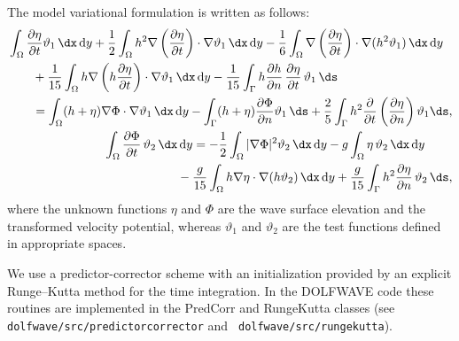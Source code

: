The model variational formulation is written as follows:
\begin{subequations}\label{eq:lopes:varform}
\begin{align}
\begin{split}
&\displaystyle \int_\Omega\frac{\partial \eta}{\partial t}\vartheta_1\, \dx\, \mathrm{d}y
  +\frac{1}{2}\int_\Omega
  h^2\nabla\left(\frac{\partial \eta}{\partial t}\right)\cdot\nabla\vartheta_1\,
  \dx\, \mathrm{d}y- \frac{1}{6}\int_\Omega \nabla\left(
  \frac{\partial \eta}{\partial t}\right)\cdot\nabla(h^2\vartheta_1)\,
  \dx\, \mathrm{d}y\\
 &\quad \quad\displaystyle +
  \frac{1}{15}\int_\Omega
  h\nabla\left(h\frac{\partial \eta}{\partial t}\right)\cdot
  \nabla\vartheta_1\, \dx\, \mathrm{d}y- \frac{1}{15}\int_\Gamma
  h\frac{\partial h}{\partial n}\,\frac{\partial \eta}{\partial t}\,\vartheta_1\, \ds
  \\ &\quad\quad=\displaystyle
  \int_\Omega(h+\eta)\nabla\Phi\cdot\nabla\vartheta_1\,
  \dx\, \mathrm{d}y -\int_\Gamma(h+\eta)\frac{\partial \Phi}{\partial n}\vartheta_1\, \ds
  +\frac{2}{5}\int_\Gamma
  h^2\frac{\partial }{\partial t}\left(\frac{\partial \eta}{\partial n}\right)\vartheta_1 \ds,
\vspace{0.3cm}
\end{split} \\
\begin{split}
&\displaystyle \int_\Omega \frac{\partial \Phi}{\partial t}\,\vartheta_2\,
  \dx\, \mathrm{d}y= -\frac{1}{2}\int_\Omega|\nabla\Phi|^2\vartheta_2\,
  \dx\, \mathrm{d}y -g\int_\Omega \eta\,\vartheta_2\,
  \dx\, \mathrm{d}y\\
&\qquad\qquad\qquad\displaystyle-\frac{g}{15}\int_\Omega
  h\nabla\eta\cdot\nabla(h\vartheta_2)\, \dx\, \mathrm{d}y
  +\frac{g}{15}\int_\Gamma h^2\frac{\partial \eta}{\partial n}\,\vartheta_2\,
  \ds,
\end{split}
\end{align}
\end{subequations}
where the unknown functions $\eta$ and $\Phi$ are the wave
surface elevation and the transformed velocity potential,
whereas $\vartheta_1$ and $\vartheta_2$ are the test
functions defined in appropriate spaces.

We use a predictor-corrector 
scheme with an initialization provided by an explicit
Runge--Kutta method for the time
integration. In the DOLFWAVE code these routines are
implemented in the PredCorr and RungeKutta classes (see {\tt
  dolfwave/src/predictorcorrector} and {\tt
  dolfwave/src/rungekutta}).

